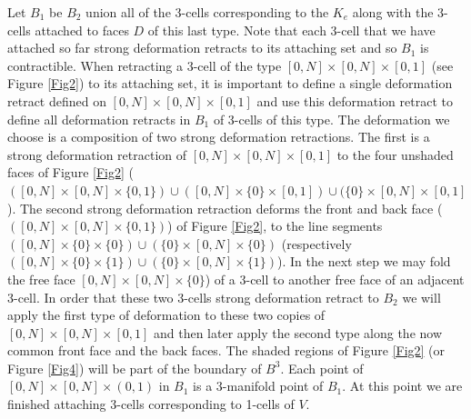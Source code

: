 \documentclass[12pt]{article}
\numberwithin{equation}{section}
\begin{document}
Let $B_1$ be $B_2$ union all of the 3-cells corresponding to the $K_e$ along with the 3-cells attached to faces $D$ of this last type. Note that each 3-cell that we have attached so far strong deformation retracts to its attaching set and so $B_1$ is contractible. When retracting a 3-cell of the type $[0,N]\times [0,N]\times [0,1]$ (see Figure \ref{Fig2}) to its attaching set, it is important to define a single deformation retract defined on $[0,N]\times [0,N]\times [0,1]$ and use this deformation retract to define all deformation retracts in $B_1$ of 3-cells of this type. The deformation we choose is a composition of two strong deformation retractions. The first is a strong deformation retraction of $[0,N]\times [0,N]\times [0,1]$ to the four unshaded faces of Figure \ref{Fig2} ($([0,N]\times[0,N]\times \{0,1\})\cup ([0,N]\times \{0\}\times [0,1])\cup (\{0\}\times [0,N]\times[0,1]$). The second strong deformation retraction deforms the front and back face ($([0,N]\times[0,N]\times \{0,1\})$) of Figure \ref{Fig2}, to the line segments  $([0,N]\times \{0\}\times \{0\})\cup (\{0\}\times [0,N]\times \{0\})$ (respectively $([0,N]\times \{0\}\times \{1\})\cup (\{0\}\times [0,N]\times \{1\})$). 
In the next step we may fold the free face $[0,N]\times [0,N]\times \{0\}$) of a 3-cell to another free face of an adjacent 3-cell. In order that these two 3-cells strong deformation retract to $B_2$ we will apply the first type of deformation to these two copies of $[0,N]\times [0,N]\times[0,1]$ and then later apply the second type along the now common front face and the back faces.   %
The shaded regions of Figure \ref{Fig2} (or Figure \ref{Fig4}) will be part of the boundary of $B^3$. Each point of $[0,N]\times [0,N]\times (0,1)$ in $B_1$ is a 3-manifold point of $B_1$. At this point we are finished attaching 3-cells corresponding to 1-cells of $V$. 
\end{document}
